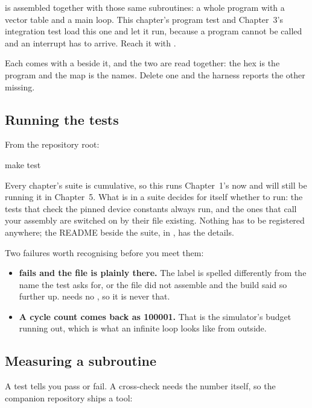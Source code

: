 \textbf{} is  assembled together with
those same subroutines: a whole program with a vector table and a main loop. This chapter's
program test and Chapter~3's integration test load this one and let it run, because a program
cannot be called and an interrupt has to arrive. Reach it with .

Each comes with a  beside it, and the two are read together: the hex is the program and
the map is the names. Delete one and the harness reports the other missing.

\subsection{Running the tests}
\label{c1:sec:tests}
From the repository root:

\begin{shell}
make test
\end{shell}

Every chapter's suite is cumulative, so this runs Chapter~1's now and will still be running it in
Chapter~5. What is in a suite decides for itself whether to run: the tests that check the pinned
device constants always run, and the ones that call your assembly are switched on by their
 file existing. Nothing has to be registered anywhere; the README beside the suite, in
, has the details.

Two failures worth recognising before you meet them:
\begin{itemize}
  \item \textbf{ fails and the file is plainly there.} The label
    is spelled differently from the name the test asks for, or the file did not assemble and the
    build said so further up.  needs no , so it is never that.
  \item \textbf{A cycle count comes back as 100001.} That is the simulator's budget running out,
    which is what an infinite loop looks like from outside.
\end{itemize}

\subsection{Measuring a subroutine}
\label{c1:sec:measure}
A test tells you pass or fail. A cross-check needs the number itself, so the companion repository
ships a tool:

